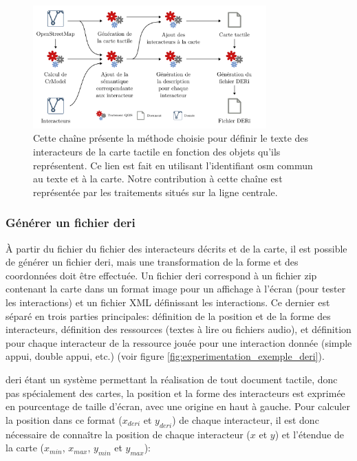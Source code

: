\begin{figure}[ht]
    \centering
    \includegraphics[width=0.8\textwidth]{images/experimentation/pipeline_creation_deri1.pdf}
    \caption[Chaîne de traitement SIG pour générer un DERi]{Cette chaîne présente la méthode choisie pour définir le texte des interacteurs de la carte tactile en fonction des objets qu'ils représentent. Ce lien est fait en utilisant l'identifiant \gls{osm} commun au texte et à la carte. Notre contribution à cette chaîne est représentée par les traitements situés sur la ligne centrale.}
    \label{fig:experimentation_lien_carte_texte}
\end{figure}

\newpage

\subsubsection{Générer un fichier \gls{deri}}

\label{sec:experimentation_generer_deri}

À partir du fichier du fichier des interacteurs décrits et de la carte, il est possible de générer un fichier \gls{deri}, mais une transformation de la forme et des coordonnées doit être effectuée. Un fichier \gls{deri} correspond à un fichier zip contenant la carte dans un format image pour un affichage à l'écran (pour tester les interactions) et un fichier XML définissant les interactions. Ce dernier est séparé en trois parties principales: définition de la position et de la forme des interacteurs, définition des ressources (textes à lire ou fichiers audio), et définition pour chaque interacteur de la ressource jouée pour une interaction donnée (simple appui, double appui, etc.) (voir figure \ref{fig:experimentation_exemple_deri}). 

\newpar{}

\gls{deri} étant un système permettant la réalisation de tout document tactile, donc pas spécialement des cartes, la position et la forme des interacteurs est exprimée en pourcentage de taille d'écran, avec une origine en haut à gauche. Pour calculer la position dans ce format ($x_{deri}$ et $y_{deri}$) de chaque interacteur, il est donc nécessaire de connaître la position de chaque interacteur ($x$ et $y$) et l'étendue de la carte ($x_{min}$, $x_{max}$, $y_{min}$ et $y_{max}$):


